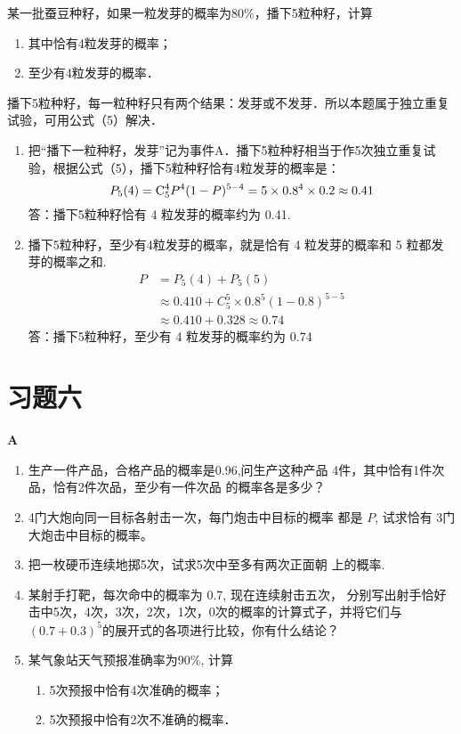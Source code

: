 \begin{example}
    某一批蚕豆种籽，如果一粒发芽的概率为80\%，播下5粒种籽，计算
\begin{enumerate}[(1)]
\item 其中恰有4粒发芽的概率；
\item 至少有4粒发芽的概率．
\end{enumerate}
\end{example}

\begin{analyze}
    播下5粒种籽，每一粒种籽只有两个结果：发芽或不发芽．所以本题属于独立重复试验，可用公式（5）解决．
\end{analyze}

\begin{solution}
\begin{enumerate}[(1)]
    \item 把“播下一粒种籽，发芽”记为事件A．播下5粒种籽相当于作5次独立重复试验，根据公式（5），播下5粒种籽恰有4粒发芽的概率是：
$$P_{5}(4)={\rm C}_{5}^{4}P^{4}(1-P)^{5-4}=5\times0.8^{4}\times0.2\approx0.41$$
答：播下5粒种籽恰有 4 粒发芽的概率约为 0.41.

\item 播下5粒种籽，至少有4粒发芽的概率，就是恰有 4
粒发芽的概率和 5 粒都发芽的概率之和.
\[\begin{split}
 P&=P_{5}(4)+P_{5}(5)\\
&\approx0.410+C_{5}^{5}\times0.8^{5}(1-0.8)^{5-5}\\
&\approx0.410+0.328\approx0.74
\end{split}\]
答：播下5粒种籽，至少有 4 粒发芽的概率约为 0.74
\end{enumerate}
\end{solution}

\section*{习题六}
\begin{center}
    \bfseries A
\end{center}

\begin{enumerate}
\item 生产一件产品，合格产品的概率是0.96,问生产这种产品
4件，其中恰有1件次品，恰有2件次品，至少有一件次品
的概率各是多少？
\item 4门大炮向同一目标各射击一次，每门炮击中目标的概率
都是 $P$, 试求恰有 3门大炮击中目标的概率。
\item 把一枚硬币连续地掷5次，试求5次中至多有两次正面朝
上的概率.
\item 某射手打靶，每次命中的概率为 0.7, 现在连续射击五次，
分别写出射手恰好击中5次，4次，3次，2次，1次，0次的概率的计算式子，并将它们与$(0.7+0.3)^{5}$的展开式的各项进行比较，你有什么结论？
\item 某气象站天气预报准确率为90\%, 计算
\begin{enumerate}
    \item 5次预报中恰有4次准确的概率；
    \item 5次预报中恰有2次不准确的概率．
\end{enumerate}
\end{enumerate}

